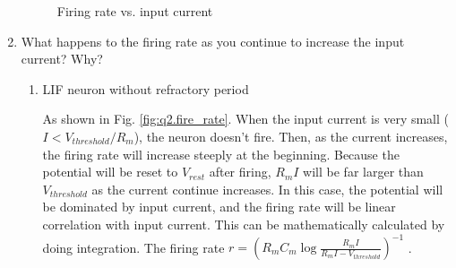 \documentclass[11pt]{article}
\begin{document}
\begin{enumerate}
		\begin{figure}[htb]
			\centering
			\caption{Firing rate vs. input current}
			\label{fig:q2}
		\end{figure}
		
		\item What happens to the firing rate as you continue to increase the input current? Why?
		\label{q3}
		
		\begin{enumerate}
		    \item {LIF neuron without refractory period}
		    
		    As shown in Fig. \ref{fig:q2.fire_rate}. When the input current is very small ($I < V_{threshold}/R_m$), the neuron doesn't fire. Then, as the current increases, the firing rate will increase steeply at the beginning. Because the potential will be reset to $V_{rest}$ after firing, $R_m I$ will be far larger than $V_{threshold}$ as the current continue increases. In this case, the potential will be dominated by input current, and the firing rate will be linear correlation with input current. This can be mathematically calculated by doing integration. The firing rate $ r = (R_m C_m \log\frac{R_m I}{R_m I - V_{threshold}})^{-1} $ \cite[pg. 93-100]{0521890799}.
		    

\end{enumerate}
\end{enumerate}
\end{document}
